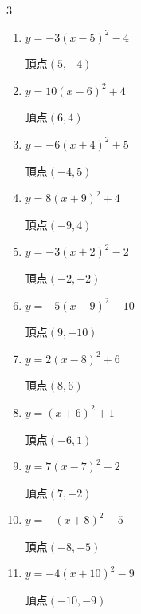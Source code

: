 \begin{multicols}{3}
\begin{enumerate}
        $\displaystyle 頂点\left( -4 , 3 \right)$

  \item $\displaystyle y=-3\left( x-5\right)^{2}-4$

        $\displaystyle 頂点\left( 5 , -4 \right)$

  \item $\displaystyle y=10\left( x-6\right)^{2}+4$

        $\displaystyle 頂点\left( 6 , 4 \right)$

  \item $\displaystyle y=-6\left( x+4\right)^{2}+5$

        $\displaystyle 頂点\left( -4 , 5 \right)$

  \item $\displaystyle y=8\left( x+9\right)^{2}+4$

        $\displaystyle 頂点\left( -9 , 4 \right)$

  \item $\displaystyle y=-3\left( x+2\right)^{2}-2$

        $\displaystyle 頂点\left( -2 , -2 \right)$

  \item $\displaystyle y=-5\left( x-9\right)^{2}-10$

        $\displaystyle 頂点\left( 9 , -10 \right)$

  \item $\displaystyle y=2\left( x-8\right)^{2}+6$

        $\displaystyle 頂点\left( 8 , 6 \right)$

  \item $\displaystyle y=\left( x+6\right)^{2}+1$

        $\displaystyle 頂点\left( -6 , 1 \right)$

\columnbreak %

  \item $\displaystyle y=7\left( x-7\right)^{2}-2$

        $\displaystyle 頂点\left( 7 , -2 \right)$

  \item $\displaystyle y=-\left( x+8\right)^{2}-5$

        $\displaystyle 頂点\left( -8 , -5 \right)$

  \item $\displaystyle y=-4\left( x+10\right)^{2}-9$

        $\displaystyle 頂点\left( -10 , -9 \right)$


\end{enumerate}
\end{multicols}
